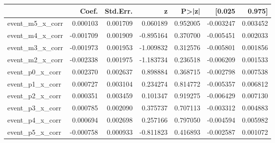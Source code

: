 \begin{tabular}{lrrrrrr}
\toprule
 & Coef. & Std.Err. & z & P>|z| & [0.025 & 0.975] \\
\midrule
event_m5_x_corr & 0.000103 & 0.001709 & 0.060189 & 0.952005 & -0.003247 & 0.003452 \\
event_m4_x_corr & -0.001709 & 0.001909 & -0.895164 & 0.370700 & -0.005451 & 0.002033 \\
event_m3_x_corr & -0.001973 & 0.001953 & -1.009832 & 0.312576 & -0.005801 & 0.001856 \\
event_m2_x_corr & -0.002338 & 0.001975 & -1.183734 & 0.236518 & -0.006209 & 0.001533 \\
event_p0_x_corr & 0.002370 & 0.002637 & 0.898884 & 0.368715 & -0.002798 & 0.007538 \\
event_p1_x_corr & 0.000727 & 0.003104 & 0.234274 & 0.814772 & -0.005357 & 0.006812 \\
event_p2_x_corr & 0.000351 & 0.003459 & 0.101347 & 0.919275 & -0.006429 & 0.007130 \\
event_p3_x_corr & 0.000785 & 0.002090 & 0.375737 & 0.707113 & -0.003312 & 0.004883 \\
event_p4_x_corr & 0.000694 & 0.002698 & 0.257166 & 0.797050 & -0.004594 & 0.005982 \\
event_p5_x_corr & -0.000758 & 0.000933 & -0.811823 & 0.416893 & -0.002587 & 0.001072 \\
\bottomrule
\end{tabular}
